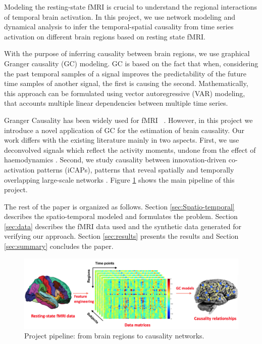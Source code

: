 \documentclass[10pt,conference,compsocconf]{IEEEtran}
\begin{document}
Modeling the resting-state fMRI is crucial to understand the regional interactions of temporal brain activation. In this project, we use network modeling and dynamical analysis to infer the temporal-spatial causality from time series activation on different brain regions based on resting state fMRI. 

With the purpose of inferring causality between brain regions, we use graphical Granger causality (GC) modeling. GC is based on the fact that when, considering the past temporal samples of a signal improves the predictability of the future time samples of another signal, the first is causing the second. Mathematically, this approach can be formulated using vector autoregressive (VAR) modeling, that accounts multiple linear dependencies between multiple time series. 

Granger Causality has been widely used for fMRI ~\cite{deshpande2010effect, roebroeck2005mapping, hamilton2011investigating,wen2013granger,deshpande2009multivariate}. However, in this project we introduce a novel application of GC for the estimation of brain causality. Our work differs with the existing literature mainly in two aspects. First, we use deconvolved signals which reflect the activity moments, undone from the effect of haemodynamics \cite{karahanouglu2013total}. Second, we study causality between innovation-driven co-activation patterns (iCAPs), patterns that reveal spatially and temporally overlapping large-scale networks \cite{icap}. Figure \ref{fig:task_graph} shows the main pipeline of this project.

The rest of the paper is organized as follows. Section \ref{sec:Spatio-temporal} describes the spatio-temporal modeled and formulates the problem. Section \ref{sec:data} describes the fMRI data used and the synthetic data generated for verifying our approach. Section \ref{sec:results} presents the results and Section \ref{sec:summary} concludes the paper.


\begin{figure}
    \centering
    \includegraphics[scale=0.08]{images/task_graph.jpg}
    \vspace{-5mm}
    \caption{Project pipeline: from brain regions to causality networks\label{fig:task_graph}.}
    \vspace{-7mm}
\end{figure}
\end{document}
